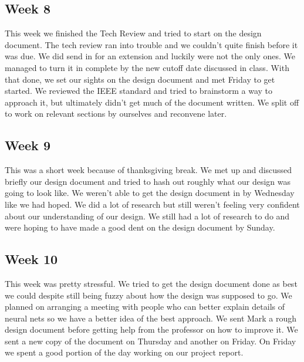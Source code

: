 \documentclass[onecolumn, draftclsnofoot,10pt, compsoc]{IEEEtran}
\begin{document}
\subsection{Week 8}
This week we finished the Tech Review and tried to start on the design document.
The tech review ran into trouble and we couldn't quite finish before it was due.
We did send in for an extension and luckily were not the only ones.
We managed to turn it in complete by the new cutoff date discussed in class.
With that done, we set our sights on the design document and met Friday to get started.
We reviewed the IEEE standard and tried to brainstorm a way to approach it, but ultimately didn't get much of the document written.
We split off to work on relevant sections by ourselves and reconvene later.

\subsection{Week 9}
This was a short week because of thanksgiving break.
We met up and discussed briefly our design document and tried to hash out roughly what our design was going to look like.
We weren't able to get the design document in by Wednesday like we had hoped.
We did a lot of research but still weren't feeling very confident about our understanding of our design.
We still had a lot of research to do and were hoping to have made a good dent on the design document by Sunday.

\subsection{Week 10}
This week was pretty stressful.
We tried to get the design document done as best we could despite still being fuzzy about how the design was supposed to go.
We planned on arranging a meeting with people who can better explain details of neural nets so we have a better idea of the best approach.
We sent Mark a rough design document before getting help from the professor on how to improve it.
We sent a new copy of the document on Thursday and another on Friday.
On Friday we spent a good portion of the day working on our project report.
\end{document}
